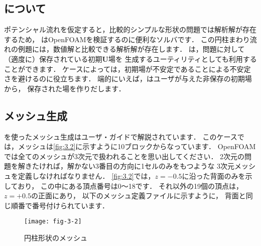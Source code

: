 \subsection{について}
\label{ssec:3.1.2}
ポテンシャル流れを仮定すると，比較的シンプルな形状の問題では解析解が存在するため，
はOpenFOAMを検証するのに便利なソルバです．
この円柱まわり流れの例題には，数値解と比較できる解析解が存在します．
は，問題に対して（適度に）保存されている初期$\bm{U}$場を
生成するユーティリティとしても利用することができます．
ケースによっては，初期場が不安定であることによる不安定さを避けるのに役立ちます．
端的にいえば，はユーザが与えた非保存の初期場から，
保存された場を作りだします．


\subsection{メッシュ生成}
\label{ssec:3.1.3}
%
%
を使ったメッシュ生成はユーザ・ガイドで解説されています．
このケースでは，メッシュは\autoref{fig:3.2}に示すように10ブロックからなっています．
OpenFOAMでは全てのメッシュが3次元で扱われることを思い出してください．
2次元の問題を解きたければ，解かない3番目の方向に1セルのみをもつような
3次元メッシュを定義しなければなりません．
\autoref{fig:3.2}では，$z = -0.5$に沿った背面のみを示しており，
この中にある頂点番号は0〜18です．
それ以外の19個の頂点は，$z = +0.5$の正面にあり，
以下のメッシュ定義ファイルに示すように，
背面と同じ順番で番号付けられています．


\begin{figure}[b]
 \texttt{[image: fig-3-2]}
 \caption{円柱形状のメッシュ}
 \label{fig:3.2}
\end{figure}


